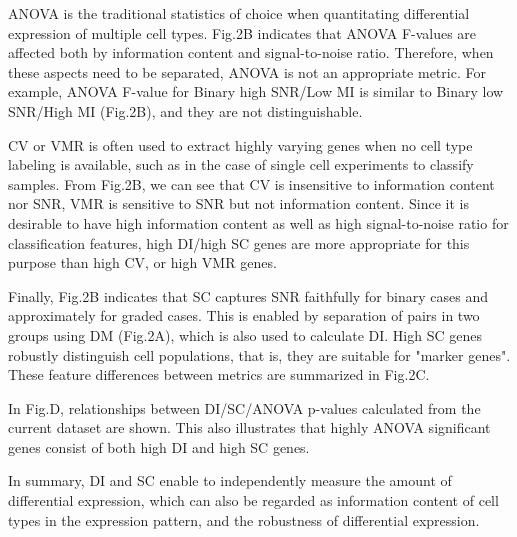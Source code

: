 ANOVA is the traditional statistics of choice when quantitating differential expression of multiple cell types. Fig.2B indicates that ANOVA F-values are affected both by information content and signal-to-noise ratio. Therefore, when these aspects need to be separated, ANOVA is not an appropriate metric. For example, ANOVA F-value for Binary high SNR/Low MI is similar to Binary low SNR/High MI (Fig.2B), and they are not distinguishable. 

CV or VMR is often used to extract highly varying genes when no cell type labeling is available, such as in the case of single cell experiments to classify samples. From Fig.2B, we can see that CV is insensitive to information content nor SNR, VMR is sensitive to SNR but not information content.  Since it is desirable to have high information content as well as high signal-to-noise ratio for classification features, high DI/high SC genes are more appropriate for this purpose than high CV, or high VMR genes. 

Finally, Fig.2B indicates that SC captures SNR faithfully for binary cases and approximately for graded cases. This is enabled by separation of pairs in two groups using DM (Fig.2A), which is also used to calculate DI. High SC genes robustly distinguish cell populations, that is, they are suitable for "marker genes".  These feature differences between metrics are summarized in Fig.2C.

In Fig.D, relationships between DI/SC/ANOVA p-values calculated from the current dataset are shown. This also illustrates that highly  ANOVA significant genes consist of both high DI and high SC genes. 

In summary, DI and SC enable to independently measure the amount of differential expression, which can also be regarded as information content of cell types in the expression pattern, and the robustness of differential expression.